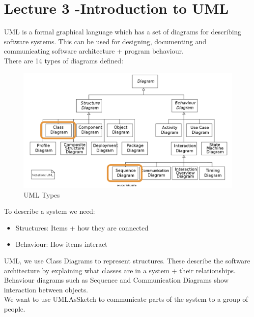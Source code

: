 \documentclass{article}
\begin{document}
\section{Lecture 3 -Introduction to UML}
UML is a formal graphical language which has a set of diagrams for describing software systems. This can be used for designing, documenting and communicating software architecture + program behaviour. \\
There are 14 types of diagrams defined:
\begin{figure}[H]
\centering
\includegraphics[width = 0.5\linewidth]{Pictures/Screenshot 2023-01-27 at 12.04.06.png}
\caption{UML Types}
\end{figure}
To describe a system we need:
\begin{itemize}
    \item Structures: Items + how they are connected
    \item Behaviour: How items interact
\end{itemize}
UML, we use Class Diagrams to represent structures. These describe the software architecture by explaining what classes are in a system + their relationships. \\
Behaviour diagrams such as Sequence and Communication Diagrams show interaction between objects. \\
We want to use UMLAsSketch to communicate parts of the system to a group of people.
\end{document}

